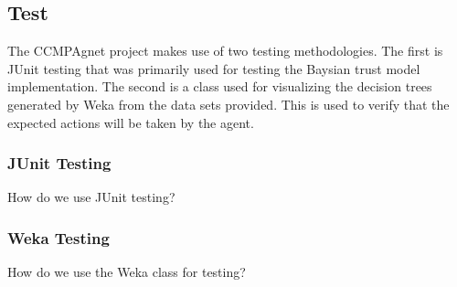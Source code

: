 \subsection{Test}
The CCMPAgnet project makes use of two testing methodologies.  The first is
JUnit testing that was primarily used for testing the Baysian trust model
implementation.  The second is a class used for visualizing the decision trees
generated by Weka from the data sets provided.  This is used to verify that the
expected actions will be taken by the agent.

\subsubsection{JUnit Testing}
How do we use JUnit testing?

\subsubsection{Weka Testing}
How do we use the Weka class for testing?
